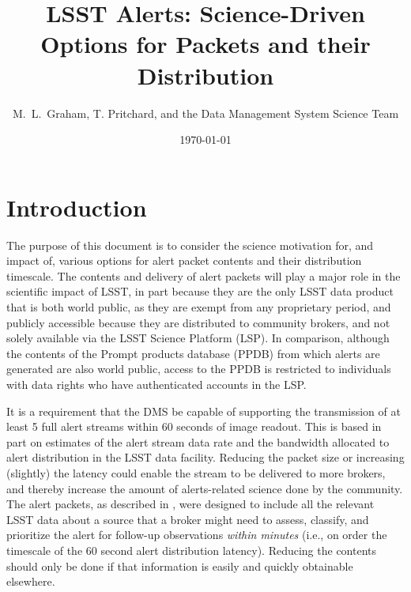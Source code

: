\documentclass[DM,lsstdraft,authoryear,toc]{lsstdoc}
\title[Alerts Menu]{LSST Alerts: Science-Driven Options for Packets and their Distribution}
\author{%
M.~L.~Graham, T. Pritchard, and the Data Management System Science Team
}
\date{\today}
\begin{document}

\maketitle

\section{Introduction} \label{sec:intro}


The purpose of this document is to consider the science motivation for, and impact of, various options for alert packet contents and their distribution timescale.
The contents and delivery of alert packets will play a major role in the scientific impact of LSST, in part because they are the only LSST data product that is both world public, as they are exempt from any proprietary period, and publicly accessible because they are distributed to community brokers, and not solely available via the LSST Science Platform (LSP).
In comparison, although the contents of the Prompt products database (PPDB) from which alerts are generated are also world public, access to the PPDB is restricted to individuals with data rights  who have authenticated accounts in the LSP.

It is a requirement that the DMS be capable of supporting the transmission of at least 5 full alert streams within 60 seconds of image readout.
This is based in part on estimates of the alert stream data rate and the bandwidth allocated to alert distribution in the LSST data facility.
Reducing the packet size or increasing (slightly) the latency could enable the stream to be delivered to more brokers, and thereby increase the amount of alerts-related science done by the community.
The alert packets, as described in , were designed to include all the relevant LSST data about a source that a broker might need to assess, classify, and prioritize the alert for follow-up observations \emph{within minutes} (i.e., on order the timescale of the 60 second alert distribution latency).
Reducing the contents should only be done if that information is easily and quickly obtainable elsewhere. 
\end{document}
